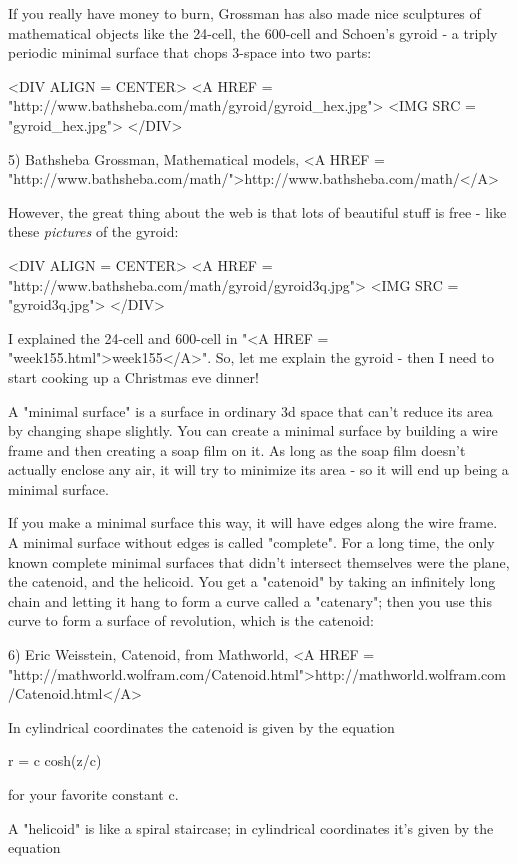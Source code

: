 If you really have money to burn, Grossman has also made nice sculptures
of mathematical objects like the 24-cell, the 600-cell and Schoen's
gyroid - a triply periodic minimal surface that chops 3-space into two parts:

<DIV ALIGN = CENTER>
<A HREF = "http://www.bathsheba.com/math/gyroid/gyroid_hex.jpg">
<IMG SRC = "gyroid_hex.jpg">
</DIV>

5) Bathsheba Grossman, Mathematical models, <A HREF = "http://www.bathsheba.com/math/">http://www.bathsheba.com/math/</A>

However, the great thing about the web is that lots of beautiful stuff
is free - like these \emph{pictures} of the gyroid:

<DIV ALIGN = CENTER>
<A HREF = "http://www.bathsheba.com/math/gyroid/gyroid3q.jpg">
<IMG SRC = "gyroid3q.jpg">
</DIV>


I explained the 24-cell and 600-cell in 
"<A HREF = "week155.html">week155</A>".  So, let me explain 
the gyroid - then I need to start cooking up a Christmas eve dinner!

A "minimal surface" is a surface in ordinary 3d space that 
can't reduce
its area by changing shape slightly.  You can create a minimal surface 
by building a wire frame and then creating a soap film on it.  As long 
as the soap film doesn't actually enclose any air, it will try to minimize
its area - so it will end up being a minimal surface.  

If you make a minimal surface this way, it will have edges along the wire
frame.  A minimal surface without edges is called "complete".  
For a long time,
the only known complete minimal surfaces that didn't intersect
themselves were the plane, the catenoid, and the helicoid.   You get a 
"catenoid" by taking an infinitely long chain and letting it hang to 
form a curve called a "catenary"; then you use this curve to 
form a surface of revolution, which is the catenoid:

6) Eric Weisstein, Catenoid, from Mathworld, 
<A HREF = "http://mathworld.wolfram.com/Catenoid.html">http://mathworld.wolfram.com/Catenoid.html</A>

In cylindrical coordinates the catenoid is given by the 
equation

r = c cosh(z/c) 

for your favorite constant c.

A "helicoid" is like a spiral staircase; in cylindrical 
coordinates it's given by the equation

